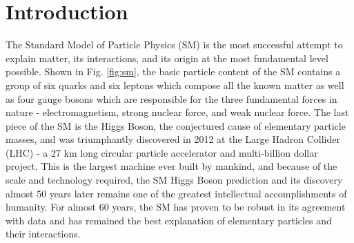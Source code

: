 \chapter{Introduction}\label{chap:intro}






The Standard Model of Particle Physics (SM) is the most successful attempt to explain matter, its interactions, and its origin at the most fundamental level possible. Shown in Fig. \ref{fig:sm}, the basic particle content of the SM contains a group of six quarks and six leptons which compose all the known matter as well as four gauge bosons which are responsible for the three fundamental forces in nature - electromagnetism, strong nuclear force, and weak nuclear force. The last piece of the SM is the Higgs Boson, the conjectured cause of elementary particle masses, and was triumphantly discovered in 2012 at the Large Hadron Collider (LHC) - a 27 km long circular particle accelerator and multi-billion dollar project. This is the largest machine ever built by mankind, and because of the scale and technology required, the SM Higgs Boson prediction and its discovery almost 50 years later remains one of the greatest intellectual accomplishments of humanity. For almost 60 years, the SM has proven to be robust in its agreement with data and has remained the best explanation of elementary particles and their interactions.

